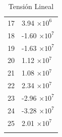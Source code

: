 \documentclass[a4paper,11pt]{article}
\begin{document}
\begin{center}
\begin{longtable}{|R{1.5cm}|R{2.6cm}|}
   17 &         3.94 $\times 10^{           6}$ \\
   18 &        -1.60 $\times 10^{           7}$ \\
   19 &        -1.63 $\times 10^{           7}$ \\
   20 &         1.12 $\times 10^{           7}$ \\
   21 &         1.08 $\times 10^{           7}$ \\
 {\color{OliveGreen}  22} & {\color{OliveGreen}        2.34 $\times 10^{           7}$} \\
   23 &        -2.96 $\times 10^{           7}$ \\
 {\color{red}  24} & {\color{red}       -3.28 $\times 10^{           7}$}\\
   25 &         2.01 $\times 10^{           7}$ \\
\bottomrule[0.8mm]                               
\caption{Tensión Lineal}             
\end{longtable}                                  
\end{center}                                     
\end{document}
